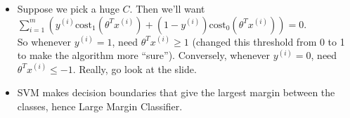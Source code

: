 \documentclass[10pt]{article}
\begin{document}
\begin{itemize}
  \item Suppose we pick a huge $C$. Then we'll want $\sum_{i=1}^m \left( y^{(i)} \text{cost}_1(\theta^Tx^{(i)}) + (1 - y^{(i)}) \text{cost}_0(\theta^Tx^{(i)}) \right)=0$. \\
    So whenever $y^{(i)}=1$, need $\theta^T x^{(i)} \geq 1$ (changed this threshold from 0 to 1 to make the algorithm more ``sure''). Conversely, whenever $y^{(i)}=0$, need $\theta^Tx^{(i)} \leq -1$.
    Really, go look at the slide.
  \item SVM makes decision boundaries that give the largest margin between the classes, hence Large Margin Classifier.
\end{itemize}
\end{document}
